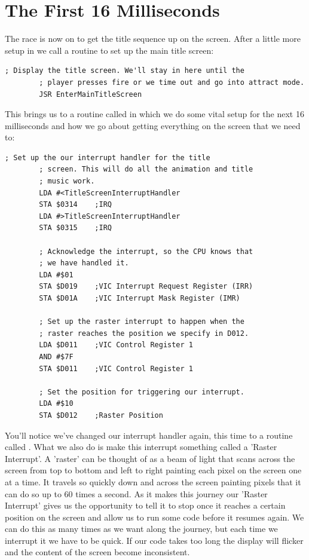 \chapter{The First 16 Milliseconds} 
\lstset{style=6502Style}

The race is now on to get the title sequence up on the screen. After a little more setup in 
we call a routine to set up the main title screen:

\begin{lstlisting}[caption=In \icode{MainControlLoop}]
        ; Display the title screen. We'll stay in here until the
        ; player presses fire or we time out and go into attract mode.
        JSR EnterMainTitleScreen
\end{lstlisting}

This brings us to a routine called  in
which we do some vital setup for the next 16 milliseconds and how we go about getting everything
on the screen that we need to:


\begin{lstlisting}[caption=In \icode{InitializeSpritesAndInterruptsForTitleScreen}]
        ; Set up the our interrupt handler for the title
        ; screen. This will do all the animation and title
        ; music work.
        LDA #<TitleScreenInterruptHandler
        STA $0314    ;IRQ
        LDA #>TitleScreenInterruptHandler
        STA $0315    ;IRQ

        ; Acknowledge the interrupt, so the CPU knows that
        ; we have handled it.
        LDA #$01
        STA $D019    ;VIC Interrupt Request Register (IRR)
        STA $D01A    ;VIC Interrupt Mask Register (IMR)

        ; Set up the raster interrupt to happen when the
        ; raster reaches the position we specify in D012.
        LDA $D011    ;VIC Control Register 1
        AND #$7F
        STA $D011    ;VIC Control Register 1

        ; Set the position for triggering our interrupt.
        LDA #$10
        STA $D012    ;Raster Position
\end{lstlisting}

You'll notice we've changed our interrupt handler again, this time to a routine called
. What we also do is make this interrupt something
called a 'Raster Interrupt'. A 'raster' can be thought of as a beam of light that scans
across the screen from top to bottom and left to right painting each pixel on the screen
one at a time. It travels so quickly down and across the screen painting pixels that it
can do so up to 60 times a second. As it makes this journey our 'Raster Interrupt' gives
us the opportunity to tell it to stop once it reaches a certain position on the screen
and allow us to run some code before it resumes again. We can do this as many times as
we want along the journey, but each time we interrupt it we have to be quick. If our code
takes too long the display will flicker and the content of the screen become inconsistent.

